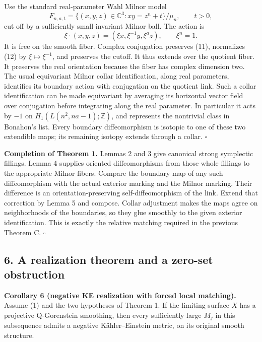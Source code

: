 \documentclass[
  11pt,
]{article}
\begin{document}
Use the standard real-parameter Wahl Milnor model \[
 F_{n,a,t}
  =\{(x,y,z)\in\mathbb C^3:xy=z^n+t\}/\mu_n,
                 \qquad t>0,                           \tag{11}
\] cut off by a sufficiently small invariant Milnor ball. The action is
\[
       \xi\cdot(x,y,z)=(\xi x,\xi^{-1}y,\xi^a z),
                  \qquad\xi^n=1.                       \tag{12}
\] It is free on the smooth fiber. Complex conjugation preserves (11),
normalizes (12) by \(\xi\mapsto\xi^{-1}\), and preserves the cutoff. It
thus extends over the quotient fiber. It preserves the real orientation
because the fiber has complex dimension two. The usual equivariant
Milnor collar identification, along real parameters, identifies its
boundary action with conjugation on the quotient link. Such a collar
identification can be made equivariant by averaging its horizontal
vector field over conjugation before integrating along the real
parameter. In particular it acts by \(-1\) on
\(H_1(L(n^2,na-1);\mathbb Z)\), and represents the nontrivial class in
Bonahon's list. Every boundary diffeomorphism is isotopic to one of
these two extendible maps; its remaining isotopy extends through a
collar. \(\square\)

\textbf{Completion of Theorem 1.} Lemmas 2 and 3 give canonical strong
symplectic fillings. Lemma 4 supplies oriented diffeomorphisms from
those whole fillings to the appropriate Milnor fibers. Compare the
boundary map of any such diffeomorphism with the actual exterior marking
and the Milnor marking. Their difference is an orientation-preserving
self-diffeomorphism of the link. Extend that correction by Lemma 5 and
compose. Collar adjustment makes the maps agree on neighborhoods of the
boundaries, so they glue smoothly to the given exterior identification.
This is exactly the relative matching required in the previous Theorem
C. \(\square\)

\hypertarget{a-realization-theorem-and-a-zero-set-obstruction}{%
\subsection{6. A realization theorem and a zero-set
obstruction}\label{a-realization-theorem-and-a-zero-set-obstruction}}

\textbf{Corollary 6 (negative KE realization with forced local
matching).} Assume (1) and the two hypotheses of Theorem 1. If the
limiting surface \(X\) has a projective Q-Gorenstein smoothing, then
every sufficiently large \(M_j\) in this subsequence admits a negative
Kähler--Einstein metric, on its original smooth structure.
\end{document}

